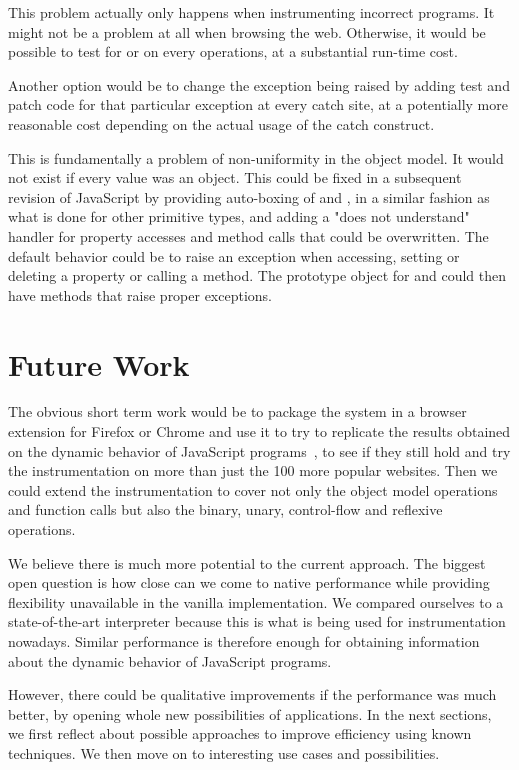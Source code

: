 This problem actually only happens when instrumenting incorrect programs. It
might not be a problem at all when browsing the web. Otherwise, it would be
possible to test for  or  on every operations, at a
substantial run-time cost.

Another option would be to change the exception being raised by adding test and
patch code for that particular exception at every catch site, at a
potentially more reasonable cost depending on the actual usage of the catch
construct.

This is fundamentally a problem of non-uniformity in the object model. It would
not exist if every value was an object.  This could be fixed in a subsequent
revision of JavaScript by providing auto-boxing of  and
, in a similar fashion as what is done for other primitive types,
and adding a "does not understand" handler for property accesses and method
calls that could be overwritten. The default behavior could be to raise an
exception when accessing, setting or deleting a property or calling a method.
The prototype object for  and  could then have methods that
raise proper exceptions.

\section{Future Work}

The obvious short term work would be to package the system in a browser
extension for Firefox or Chrome and use it to try to replicate the results
obtained on the dynamic behavior of JavaScript programs~\cite{behavior_js}, to
see if they still hold and try the instrumentation on more than just the 100
more popular websites. Then we could extend the instrumentation to cover not
only the object model operations and function calls but also the binary, unary,
control-flow and reflexive operations.

We believe there is much more potential to the current approach. The
biggest open question is how close can we come to native performance while
providing flexibility unavailable in the vanilla implementation. We compared
ourselves to a state-of-the-art interpreter because this is what is being used
for instrumentation nowadays. Similar performance is therefore enough for
obtaining information about the dynamic behavior of JavaScript programs. 

However, there could be qualitative improvements if the performance was much
better, by opening whole new possibilities of applications.  In the next
sections, we first reflect about possible approaches to improve efficiency
using known techniques. We then move on to interesting use cases and
possibilities.

